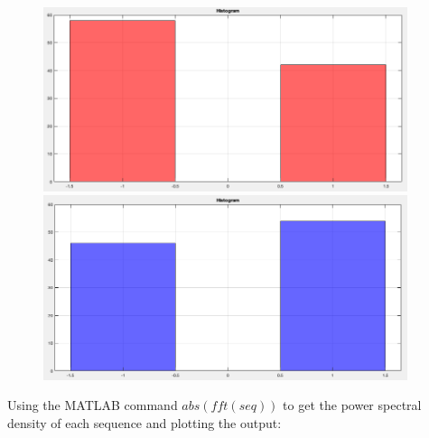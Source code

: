 \documentclass[12pt]{article}
\begin{document}
    \begin{figure}[H]
      \centering
      \begin{minipage}{0.5\textwidth}
        \centering
        \includegraphics[width=0.95\textwidth]{seq1_hist.png}
      \end{minipage}%
      \begin{minipage}{0.5\textwidth}
        \centering
        \includegraphics[width=0.95\textwidth]{seq2_hist.png}
      \end{minipage}
    \end{figure}

    \vspace{10pt}
    Using the MATLAB command $abs(fft(seq))$ to get the power spectral density 
    of each sequence and plotting the output:
\end{document}
